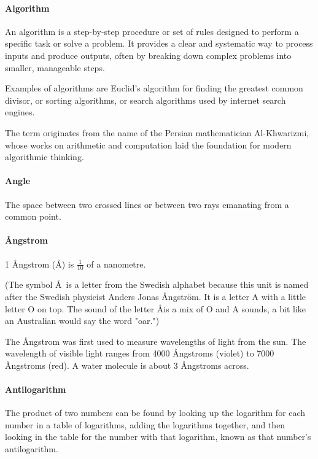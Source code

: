 \documentclass[12pt]{article}
\begin{document}
\paragraph{Algorithm}
An algorithm is a step-by-step procedure or set of rules designed to perform a specific task or solve a problem. It provides a clear and systematic way to process inputs and produce outputs, often by breaking down complex problems into smaller, manageable steps.

Examples of algorithms are Euclid's algorithm for finding the greatest common divisor, or sorting algorithms, or search algorithms used by internet search engines.

The term originates from the name of the Persian mathematician Al-Khwarizmi, whose works on arithmetic and computation laid the foundation for modern algorithmic thinking.

\paragraph{Angle} The space between two crossed lines or between two rays emanating from a common point.

\begin{center}
\end{center}

\paragraph{\AA ngstrom} 1 \AA ngstrom (\AA) is $\frac{1}{10}$ of a nanometre.

(The symbol \AA\ is a letter from the Swedish alphabet because this unit is named after the Swedish physicist Anders Jonas \AA ngström. It is a letter A with a little letter O on top. The sound of the letter \AA is a mix of O and A sounds, a bit like an Australian would say the word "oar.")
  
The \AA ngstrom was first used to measure wavelengths of light from the sun. The wavelength of visible light ranges from 4000 \AA ngstroms (violet) to 7000 \AA ngstroms (red). A water molecule is about 3 Ångstroms across.

\paragraph{Antilogarithm}
The product of two numbers can be found by looking up the logarithm for each number in a table of logarithms, adding the logarithms together, and then looking in the table for the number with that logarithm, known as that number’s antilogarithm.
\end{document}
